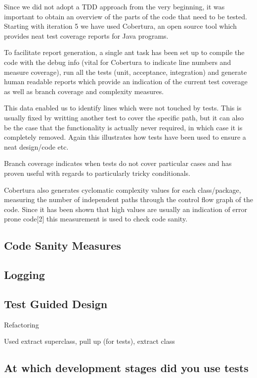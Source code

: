 \documentclass[10pt]{article}
\begin{document}
Since we did not adopt a TDD approach from the very beginning, it was important to obtain an overview of the parts of the code that need to be tested. Starting with iteration 5 we have used Cobertura,  an open source tool which provides neat test coverage reports for Java programs.

To facilitate report generation, a single ant task has been set up to compile the code with the debug info (vital for Cobertura to indicate line numbers and measure coverage), run all the tests (unit, acceptance, integration) and generate human readable reports which provide an indication of the current test coverage as well as branch coverage and complexity measures.

This data enabled us to identify lines which were not touched by tests. This is usually fixed by writting another test to cover the specific path, but it can also be the case that the functionality is actually never required, in which case it is completely removed. Again this illustrates how tests have been used to ensure a neat design/code etc. 

Branch coverage indicates when tests do not cover particular cases and has proven useful with regards to particularly tricky conditionals.

Cobertura also generates cyclomatic complexity values for each class/package, measuring the number of independent paths through the control flow graph of the code. Since it has been shown that high values are usually an indication of error prone code[2] this measurement is used to check code sanity.

\subsection{Code Sanity Measures}

\subsection{Logging}

\subsection{Test Guided Design}
Refactoring

Used extract superclass, pull up (for tests), extract class


\subsection{At which development stages did you use tests}
\end{document}

